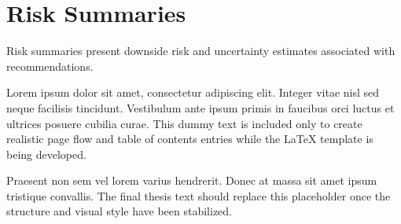 \section{Risk Summaries}

Risk summaries present downside risk and uncertainty estimates associated with recommendations.

Lorem ipsum dolor sit amet, consectetur adipiscing elit. Integer vitae nisl sed neque facilisis tincidunt. Vestibulum ante ipsum primis in faucibus orci luctus et ultrices posuere cubilia curae. This dummy text is included only to create realistic page flow and table of contents entries while the LaTeX template is being developed.

Praesent non sem vel lorem varius hendrerit. Donec at massa sit amet ipsum tristique convallis. The final thesis text should replace this placeholder once the structure and visual style have been stabilized.

